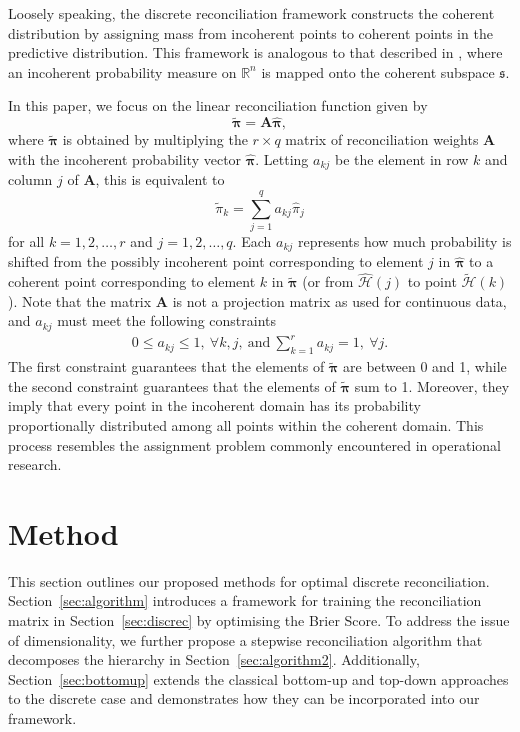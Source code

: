 \documentclass[a4paper,review,12pt,authoryear]{elsarticle}
\newcommand{\bpi}{\bm{\pi}}
\theoremstyle{definition}
\begin{document}
   Loosely speaking, the discrete reconciliation framework constructs the coherent distribution by assigning mass from incoherent points to coherent points in the predictive distribution. This framework is analogous to that described in \cite{panagiotelisProbabilisticForecastReconciliation2022}, where an incoherent probability measure on $\mathbb{R}^n$ is mapped onto the coherent subspace $\mathfrak{s}$.

   In this paper, we focus on the linear reconciliation function given by
    \begin{equation}
	    \label{eq:framework}
	    \tilde{\bpi}=\bm{A}\hat{\bpi},
    \end{equation}
   where $\tilde{\bpi}$ is obtained by multiplying the $r \times q$ matrix of reconciliation weights $\bm{A}$ with the incoherent probability vector $\hat{\bpi}$. Letting $a_{kj}$ be the element in row $k$ and column $j$ of $\bm{A}$, this is equivalent to
    \[
      \tilde{\pi}_k=\sum\limits_{j=1}^q a_{kj}\hat{{\pi}}_j
    \]
    for all $k = 1, 2, \dots, r$  and  $j = 1, 2, \dots, q$.
   Each $a_{kj}$ represents how much probability is shifted from the possibly incoherent point corresponding to element $j$ in $\hat{\bpi}$ to a coherent point corresponding to element $k$ in $\tilde{\bpi}$ (or from $\hat{\mathcal{H}}(j)$ to point $\tilde{\mathcal{H}}(k)$). Note that the matrix $\mathbf{A}$ is not a projection matrix as used for continuous data, and $a_{kj}$ must meet the following constraints
   \begin{align*}
	 0\leq a_{kj} \leq 1 , ~ \forall k, j, ~ \textrm{and} ~
	\sum\limits_{k=1}^r a_{kj} = 1 , ~ \forall j.
    \end{align*}
    The first constraint guarantees that the elements of $\tilde{\bpi}$ are between 0 and 1, while the second constraint guarantees that the elements of $\tilde{\bpi}$ sum to 1. Moreover, they imply that every point in the incoherent domain has its probability proportionally distributed among all points within the coherent domain. This process resembles the assignment problem commonly encountered in operational research.

\section{Method}
\label{sec:method}

This section outlines our proposed methods for optimal discrete reconciliation. Section~\ref{sec:algorithm} introduces a framework for training the reconciliation matrix in Section~\ref{sec:discrec} by optimising the Brier Score. To address the issue of dimensionality, we further propose a stepwise reconciliation algorithm that decomposes the hierarchy in Section~\ref{sec:algorithm2}. Additionally, Section~\ref{sec:bottomup} extends the classical bottom-up and top-down approaches to the discrete case and demonstrates how they can be incorporated into our framework.
\end{document}
